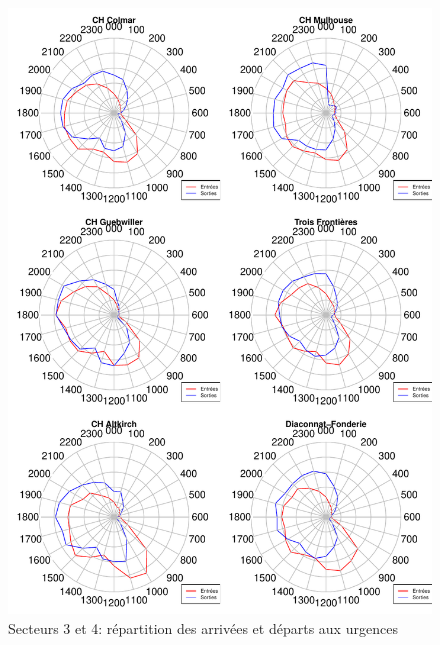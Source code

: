\documentclass[12pt,english,french,twoside]{report}\usepackage[]{graphicx}\usepackage[]{color}
\makeatletter
\def\maxwidth{ %
  \ifdim\Gin@nat@width>\linewidth
    \linewidth
  \else
    \Gin@nat@width
  \fi
}
\newenvironment{knitrout}{}{} %
\makeatother
\begin{document}
\begin{figure}
\begin{center}
\begin{knitrout}
\color{fgcolor}
\includegraphics[width=\maxwidth]{figure/test26} 

\end{knitrout}

\end{center}
\caption{Secteurs 3 et 4: répartition des arrivées et départs aux urgences}
\label{passage:col}
\end{figure}
\end{document}
